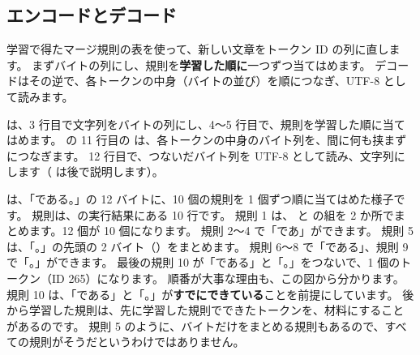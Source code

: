 \subsection*{エンコードとデコード}

学習で得たマージ規則の表を使って、新しい文章をトークン ID の列に直します。
まずバイトの列にし、規則を\textbf{学習した順に}一つずつ当てはめます。
デコードはその逆で、各トークンの中身（バイトの並び）を順につなぎ、UTF-8 として読みます。


 は、3 行目で文字列をバイトの列にし、4〜5 行目で、規則を学習した順に当てはめます。
 の 11 行目の  は、各トークンの中身のバイト列を、間に何も挟まずにつなぎます。
12 行目で、つないだバイト列を UTF-8 として読み、文字列にします（ は後で説明します）。

は、「である。」の 12 バイトに、10 個の規則を 1 個ずつ順に当てはめた様子です。
規則は、の実行結果にある 10 行です。
規則 1 は、 と  の組を 2 か所でまとめます。12 個が 10 個になります。
規則 2〜4 で「であ」ができます。
規則 5 は、「。」の先頭の 2 バイト（）をまとめます。
規則 6〜8 で「である」、規則 9 で「。」ができます。
最後の規則 10 が「である」と「。」をつないで、1 個のトークン（ID 265）になります。
順番が大事な理由も、この図から分かります。
規則 10 は、「である」と「。」が\textbf{すでにできている}ことを前提にしています。
後から学習した規則は、先に学習した規則でできたトークンを、材料にすることがあるのです。
規則 5 のように、バイトだけをまとめる規則もあるので、すべての規則がそうだというわけではありません。

